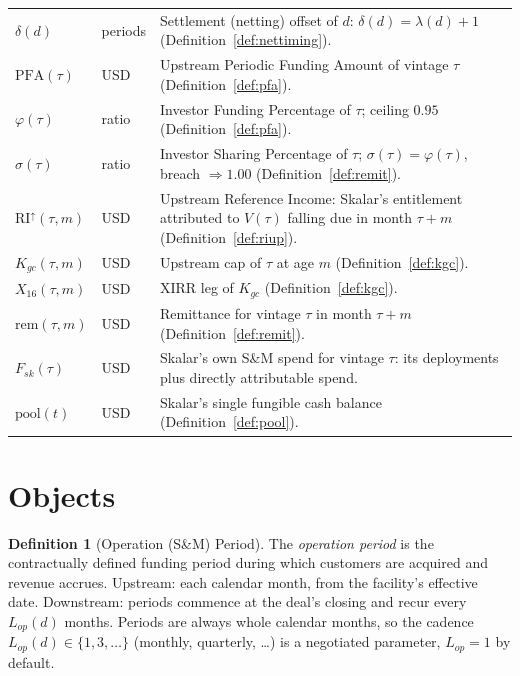 \documentclass[11pt, a4paper]{article}
\theoremstyle{definition}
\newtheorem{definition}{Definition}[section]
\newcommand{\src}[1]{}
\newcommand{\GCCIA}{upstream facility}
\newcommand{\KCIA}{downstream agreement}
\newcommand{\PFA}{\mathrm{PFA}}                   %
\newcommand{\RIup}{\mathrm{RI}^{\uparrow}}        %
\newcommand{\rem}{\mathrm{rem}}                   %
\newcommand{\Kgc}{K_{gc}}                         %
\newcommand{\Xirr}{X_{16}}                        %
\newcommand{\pool}{\mathrm{pool}}                 %
\begin{document}
\begin{longtable}{@{} L{3.0cm} L{3.4cm} L{8.4cm} @{}}
$\delta(d)$ & periods & Settlement (netting) offset of $d$: $\delta(d) = \lambda(d) + 1$ (Definition~\ref{def:nettiming}). \\[3pt]
$\PFA(\tau)$ & USD & Upstream Periodic Funding Amount of vintage $\tau$ (Definition~\ref{def:pfa}). \\[3pt]
$\varphi(\tau)$ & ratio & Investor Funding Percentage of $\tau$; ceiling $0.95$ (Definition~\ref{def:pfa}). \\[3pt]
$\sigma(\tau)$ & ratio & Investor Sharing Percentage of $\tau$; $\sigma(\tau) = \varphi(\tau)$, breach $\Rightarrow 1.00$ (Definition~\ref{def:remit}). \\[3pt]
$\RIup(\tau, m)$ & USD & Upstream Reference Income: Skalar's entitlement attributed to $V(\tau)$ falling due in month $\tau + m$ (Definition~\ref{def:riup}). \\[3pt]
$\Kgc(\tau, m)$ & USD & Upstream cap of $\tau$ at age $m$ (Definition~\ref{def:kgc}). \\[3pt]
$\Xirr(\tau, m)$ & USD & XIRR leg of $\Kgc$ (Definition~\ref{def:kgc}). \\[3pt]
$\rem(\tau, m)$ & USD & Remittance for vintage $\tau$ in month $\tau + m$ (Definition~\ref{def:remit}). \\[3pt]
$F_{sk}(\tau)$ & USD & Skalar's own S\&M spend for vintage $\tau$: its deployments plus directly attributable spend. \\[3pt]
$\pool(t)$ & USD & Skalar's single fungible cash balance (Definition~\ref{def:pool}). \\
\bottomrule
\end{longtable}

\section{Objects}\label{sec:objects}

\begin{definition}[Operation (S\&M) Period]\label{def:period}
The \emph{operation period} is the contractually defined funding period during which customers are acquired and revenue accrues. Upstream: each calendar month, from the facility's effective date. Downstream: periods commence at the deal's closing and recur every $L_{op}(d)$ months. Periods are always whole calendar months, so the cadence $L_{op}(d) \in \{1, 3, \dots\}$ (monthly, quarterly, \dots) is a negotiated parameter, $L_{op} = 1$ by default.
\src{\GCCIA{} Sch.~A (``S\&M Period''); \KCIA{} Sch.~A (``S\&M Period'').}
\end{definition}
\end{document}
